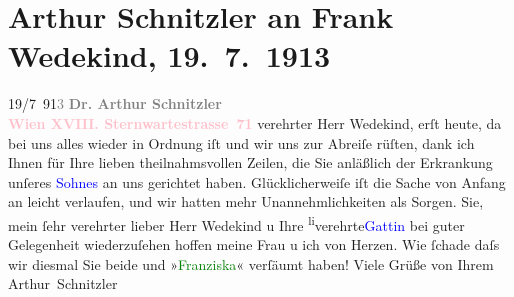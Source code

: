 

               \section[Arthur Schnitzler an Frank Wedekind, 19. 7. 1913]{ Arthur Schnitzler an Frank Wedekind, 19. 7. 1913}\nopagebreak{}\rehead{ }\normalsize\beginnumbering{} \toendnotes[C]{\smallbreak\pagebreak[2]} 
\toendnotes[C]{\smallbreak}\pstart
           \raggedleft{}19/7 91\textcolor{gray}{3}\pend
           \pstart
           {\pb}\textcolor{gray}{\textbf{Dr. Arthur Schnitzler}}{\\}\textcolor{gray}{\textbf{\textcolor{pink}{Wien XVIII. Sternwartestrasse 71}{}\ledrightnote{\textcolor{pink}{Sternwartestraße}}}}\pend
           \pstart{}verehrter Herr Wedekind,\pend\pstart
           erſt heute, da bei uns alles wieder in Ordnung iſt und wir uns zur Abreiſe
                    rüſten, dank ich Ihnen für Ihre lieben theilnahmsvollen Zeilen, die Sie
                    anläßlich der Erkrankung unſeres \textcolor{blue}{Sohnes}{} an uns gerich{\pb}tet haben. Glücklicherweiſe iſt die
                    Sache von Anfang an leicht verlaufen, und wir hatten mehr Unannehmlichkeiten als
                    Sorgen.\pend
           \pstart
           Sie, mein ſehr verehrter lieber Herr Wedekind u Ihre \substVorne{}\textsuperscript{li}\substDazwischen{}verehrte\substHinten{}{ }\textcolor{blue}{Gattin}{} bei guter
                    Gelegenheit wiederzuſehen hoffen meine Frau u ich von Herzen. Wie ſchade daſs
                    wir diesmal Sie beide und »\textcolor{green}{Franziska}{}\ledrightnote{\textcolor{green}{Franziska}}« verſäumt
                    haben!\pend
           \pstart Viele Grüße von Ihrem \spacefill\mbox{Arthur Schnitzler}\pend{}\endnumbering{}  
      
